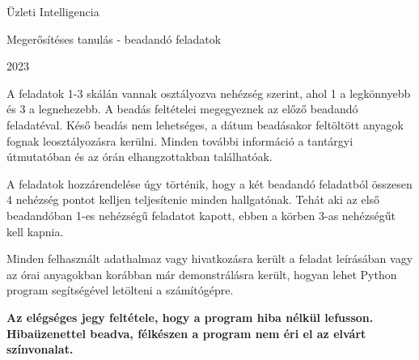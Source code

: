 \documentclass[english]{article}
\begin{document}
\begin{titlepage}
\centering

\vspace{4cm} 

\Huge

Üzleti Intelligencia

\vspace{2cm} 

\Large

Megerősítéses tanulás - beadandó feladatok

\vspace{0.5cm}

2023 %

\vspace{2cm} 

\normalsize

A feladatok 1-3 skálán vannak osztályozva nehézség szerint, ahol 1 a legkönnyebb és 3 a legnehezebb. A beadás feltételei megegyeznek az előző beadandó feladatéval. Késő beadás nem lehetséges, a dátum beadásakor feltöltött anyagok fognak leosztályozásra kerülni. Minden további információ a tantárgyi útmutatóban és az órán elhangzottakban találhatóak.
\par\medskip
A feladatok hozzárendelése úgy történik, hogy a két beadandó feladatból összesen 4 nehézség pontot kelljen teljesítenie minden hallgatónak. Tehát aki az első beadandóban 1-es nehézségű feladatot kapott, ebben a körben 3-as nehézségűt kell kapnia.
\par\medskip
Minden felhasznált adathalmaz vagy hivatkozásra került a feladat leírásában vagy az órai anyagokban korábban már demonstrálásra került, hogyan lehet Python program segítségével letölteni a számítógépre.
\par\medskip
\textbf{Az elégséges jegy feltétele, hogy a program hiba nélkül lefusson. Hibaüzenettel beadva, félkészen a program nem éri el az elvárt színvonalat.}
\end{titlepage}
\end{document}
